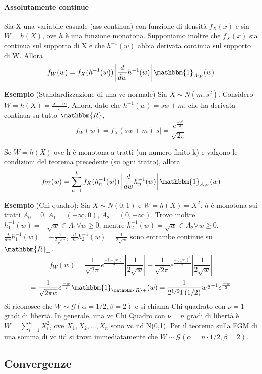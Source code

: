 \paragraph{Assolutamente continue}
\begin{teo}
Sia X una variabile casuale (ass continua) con funzione di densità $f_X(x)$ e sia $W=h(X)$, ove $h$ è una funzione monotona. 
Supponiamo inoltre che $f_X(x)$ sia continua sul supporto di X e che $h^{-1}(w)$ abbia derivata continua sul supporto di W. Allora
$$f_W(w)=f_X(h^{-1}(w))\left|\frac{d}{dw}h^{-1}(w)\right|\mathbbm{1}_{A_W}(w)$$
\end{teo}
\textbf{Esempio}
(Standardizzazione di una vc normale)
Sia $X \sim N(m,s^2)$. 
Considero $W=h(X)=\frac{X-m}{s}$. 
Allora, dato che $h^{-1}(w)=sw+m$, 
che ha derivata continua su tutto $\mathbbm{R}$,  
$$f_W(w)=f_X(sw+m)|s|=\frac{e^{\frac{-w^2 }{2}}}{\sqrt{2\pi}}$$
\begin{teo}
Se $W=h(X)$ ove h è monotona a tratti (un numero finito k) e valgono le condizioni del teorema precedente (su ogni tratto), allora
$$f_W(w)=\sum_{n=1}^k f_X(h_n^{-1}(w))\left|\frac{d}{dw}h_n^{-1}(w)\right|\mathbbm{1}_{A_W}(w)$$
\end{teo}
\textbf{Esempio} (Chi-quadro): Sia $X \sim N(0,1)$ e $W=h(X)=X^2$. $h$ è monotona sui tratti $A_0={0}$, $A_1=(-\infty,0)$, $A_2=(0,+\infty)$. 
Trovo inoltre $h_1^{-1}(w)=-\sqrt{w}\in A_1 \forall w \geq 0$, mentre $h_2^{-1}(w)=\sqrt{w}\in A_2 \forall w \geq 0$. 
$\frac{d}{dw} h_1^{-1}(w)=-\frac{1}{2\sqrt{w}}$, $\frac{d}{dw} h_2^{-1}(w)=\frac{1}{2\sqrt{w}}$ sono entrambe continue su $\mathbbm{R}_+$.
$$f_W(w)=\frac{1}{\sqrt{2\pi}}e^{\frac{-(-\sqrt{w})^2 }{2}}\left|\frac{1}{2\sqrt{w}}\right|+\frac{1}{\sqrt{2\pi}}e^{\frac{-(\sqrt{w})^2 }{2}}\left|\frac{1}{2\sqrt{w}}\right|$$ 
$$=\frac{1}{\sqrt{2\pi w}}
e^{\frac{-w}{2}}\mathbbm{1}_{\mathbbm{R}+}
(w)=\frac{1}{2^{1/2}\Gamma(1/2)}
w^{\frac{1}{2}-1}e^{\frac{-w}{2}}$$
Si riconosce che $W \sim \mathcal{G}(\alpha=1/2,\beta=2)$ e si chiama Chi quadrato con $\nu=1$ gradi di libertà.
In generale, una vc Chi Quadro con $\nu=n$ gradi di libertà è $W=\sum_{i=1}^n X_i^2$, ove $X_1,X_2,...,X_n$ sono vc iid N(0,1). Per il teorema sulla FGM di una somma di vc iid si trova immediatamente che $W \sim \mathcal{G}(\alpha=n \cdot 1/2,\beta=2)$.
\subsection{Convergenze}
